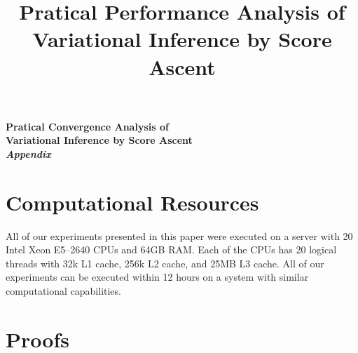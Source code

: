 \documentclass{article}
\title{Pratical Performance Analysis of \\ Variational Inference by Score Ascent}
\author{%
}
\begin{document}
\maketitle

\begin{abstract}
  
\end{abstract}









\newpage



\newpage
\appendix

\begin{center}
  \LARGE\bf
  Pratical Convergence Analysis of \\
  Variational Inference by Score Ascent \\
  \textit{Appendix}
\end{center}

\section{Computational Resources}\label{section:resources}
 All of our experiments presented in this paper were executed on a server with 20 Intel Xeon E5--2640 CPUs and 64GB RAM.
Each of the CPUs has 20 logical threads with 32k L1 cache, 256k L2 cache, and 25MB L3 cache.
All of our experiments can be executed within 12 hours on a system with similar computational capabilities.


%


\section{Proofs}\label{section:proofs}
%
%
\printProofs
\end{document}
